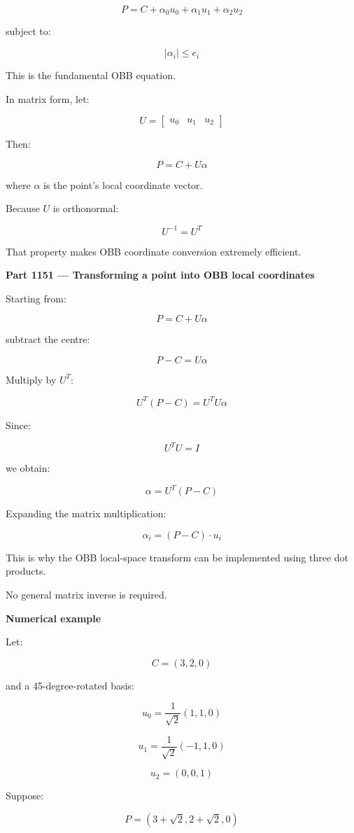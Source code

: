 \[
\boxed{ P=C+\alpha_0u_0+\alpha_1u_1+\alpha_2u_2 }
\]

subject to:

\[
|\alpha_i|\le e_i
\]

This is the fundamental OBB equation.

In matrix form, let:

\[
U= \begin{bmatrix} u_0&u_1&u_2 \end{bmatrix}
\]

Then:

\[
P=C+U\alpha
\]

where \(\alpha\) is the point's local coordinate vector.

Because \(U\) is orthonormal:

\[
\boxed{U^{-1}=U^T}
\]

That property makes OBB coordinate conversion extremely efficient.

\textbf{Part 1151 --- Transforming a point into OBB local coordinates}

Starting from:

\[
P=C+U\alpha
\]

subtract the centre:

\[
P-C=U\alpha
\]

Multiply by \(U^T\):

\[
U^T(P-C)=U^TU\alpha
\]

Since:

\[
U^TU=I
\]

we obtain:

\[
\boxed{\alpha=U^T(P-C)}
\]

Expanding the matrix multiplication:

\[
\boxed{ \alpha_i=(P-C)\cdot u_i }
\]

This is why the OBB local-space transform can be implemented using three dot products.

No general matrix inverse is required.

\textbf{Numerical example}

Let:

\[
C=(3,2,0)
\]

and a 45-degree-rotated basis:

\[
u_0=\frac{1}{\sqrt2}(1,1,0)
\]

\[
u_1=\frac{1}{\sqrt2}(-1,1,0)
\]

\[
u_2=(0,0,1)
\]

Suppose:

\[
P=(3+\sqrt2,2+\sqrt2,0)
\]

